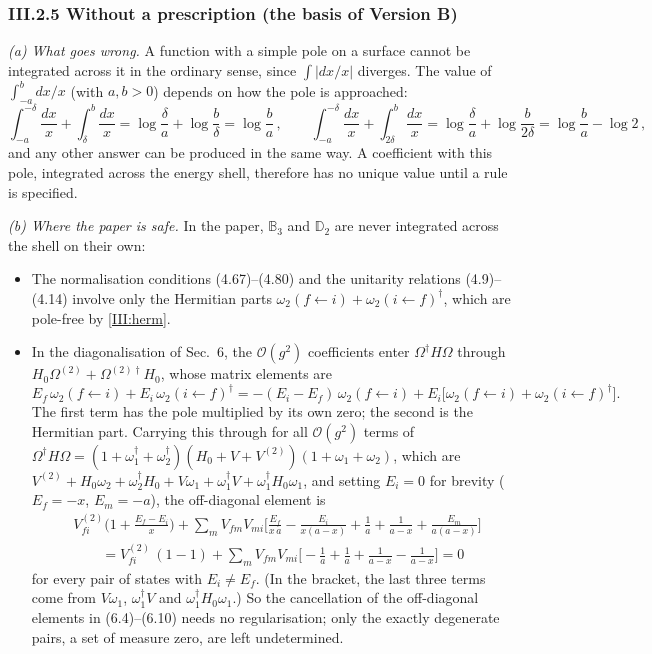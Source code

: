 \subsubsection*{III.2.5 Without a prescription (the basis of Version B)}

\emph{(a) What goes wrong.} A function with a simple pole on a surface cannot be integrated across it in the ordinary sense, since $\int|dx/x|$ diverges. The value of $\int_{-a}^{b}dx/x$ (with $a,b>0$) depends on how the pole is approached:
\[
\int_{-a}^{-\delta}\frac{dx}{x}+\int_{\delta}^{b}\frac{dx}{x}=\log\frac{\delta}{a}+\log\frac{b}{\delta}=\log\frac ba\,,\qquad
\int_{-a}^{-\delta}\frac{dx}{x}+\int_{2\delta}^{b}\frac{dx}{x}=\log\frac{\delta}{a}+\log\frac{b}{2\delta}=\log\frac ba-\log2\,,
\]
and any other answer can be produced in the same way. A coefficient with this pole, integrated across the energy shell, therefore has no unique value until a rule is specified.

\emph{(b) Where the paper is safe.} In the paper, $\mathbb B_3$ and $\mathbb D_2$ are never integrated across the shell on their own:
\begin{itemize}[leftmargin=18pt,itemsep=2pt]
\item The normalisation conditions (4.67)--(4.80) and the unitarity relations (4.9)--(4.14) involve only the Hermitian parts $\omega_2(f\!\leftarrow\! i)+\omega_2(i\!\leftarrow\! f)^\dagger$, which are pole-free by \eqref{III:herm}.
\item In the diagonalisation of Sec.~6, the $\mathcal O(g^2)$ coefficients enter $\Omega^\dagger H\Omega$ through $H_0\Omega^{(2)}+\Omega^{(2)\dagger}H_0$, whose matrix elements are
\[
E_f\,\omega_2(f\!\leftarrow\! i)+E_i\,\omega_2(i\!\leftarrow\! f)^\dagger=-(E_i-E_f)\,\omega_2(f\!\leftarrow\! i)+E_i\big[\omega_2(f\!\leftarrow\! i)+\omega_2(i\!\leftarrow\! f)^\dagger\big].
\]
The first term has the pole multiplied by its own zero; the second is the Hermitian part. Carrying this through for all $\mathcal O(g^2)$ terms of $\Omega^\dagger H\Omega=(1+\omega_1^\dagger+\omega_2^\dagger)(H_0+V+V^{(2)})(1+\omega_1+\omega_2)$, which are $V^{(2)}+H_0\omega_2+\omega_2^\dagger H_0+V\omega_1+\omega_1^\dagger V+\omega_1^\dagger H_0\omega_1$, and setting $E_i=0$ for brevity ($E_f=-x$, $E_m=-a$), the off-diagonal element is
\begin{align}
&V^{(2)}_{fi}\Big(1+\frac{E_f-E_i}{x}\Big)+\sum_mV_{fm}V_{mi}\Big[\frac{E_f}{x\,a}-\frac{E_i}{x(a-x)}+\frac1a+\frac{1}{a-x}+\frac{E_m}{a(a-x)}\Big]\nonumber\\
&\qquad=V^{(2)}_{fi}\,(1-1)+\sum_mV_{fm}V_{mi}\Big[-\frac1a+\frac1a+\frac{1}{a-x}-\frac{1}{a-x}\Big]=0
\label{III:noeps}
\end{align}
for every pair of states with $E_i\neq E_f$. (In the bracket, the last three terms come from $V\omega_1$, $\omega_1^\dagger V$ and $\omega_1^\dagger H_0\omega_1$.) So the cancellation of the off-diagonal elements in (6.4)--(6.10) needs no regularisation; only the exactly degenerate pairs, a set of measure zero, are left undetermined.
\end{itemize}

